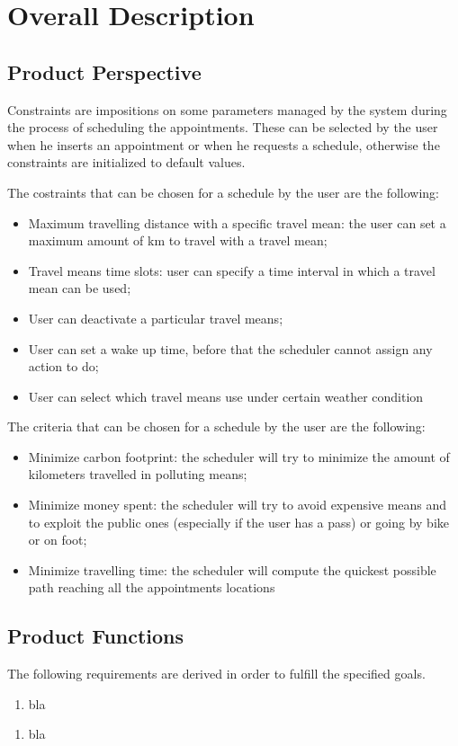 \chapter{Overall Description}

\section{Product Perspective}
Constraints are impositions on some parameters managed by the system during the process of scheduling the appointments. These can be selected by the user when he inserts an appointment or when he requests a schedule, otherwise the constraints are initialized to default values. 

The costraints that can be chosen for a schedule by the user are the following:
\begin{itemize}
\item Maximum travelling distance with a specific travel mean: the user can set a maximum amount of km to travel with a travel mean;
\item Travel means time slots: user can specify a time interval in which a travel mean can be used;
\item User can deactivate a particular travel means;
\item User can set a wake up time, before that the scheduler cannot assign any action to do;
\item User can select which travel means use under certain weather condition
\end{itemize}

The criteria that can be chosen for a schedule by the user are the following:

\begin{itemize}
\item Minimize carbon footprint: the scheduler will try to minimize the amount of kilometers travelled in polluting means;
\item Minimize money spent: the scheduler will try to avoid expensive means and to exploit the public ones (especially if the user has a pass) or going by bike or on foot;
\item Minimize travelling time: the scheduler will compute the quickest possible path reaching all the appointments locations
\end{itemize}

\section{Product Functions}
The following requirements are derived in order to fulfill the specified goals.
\begin{enumerate}
\renewcommand\labelenumi{\textbf{R\theenumi}}
\item bla \label{req:R1}
\end{enumerate}






\begin{enumerate}
\item bla
\end{enumerate}

